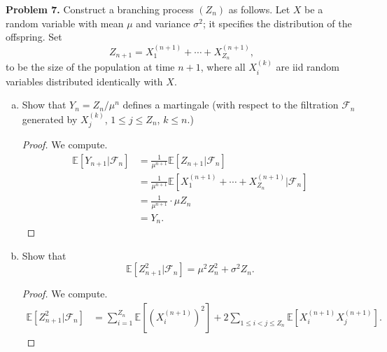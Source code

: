\documentclass[11pt,letterpaper]{report}
\newcommand{\mcal}[1]{\mathcal{#1}}
\newcommand{\E}{\mathbb{E}}
\begin{document}
\noindent\textbf{Problem 7. }
Construct a branching process $(Z_n)$ as follows. Let $X$ be a random variable with mean $\mu$ and variance $\sigma^2$; it specifies the distribution of the offspring. Set
\[
Z_{n+1} = X_1^{(n+1)} + \cdots + X_{Z_n}^{(n+1)},
\]
to be the size of the population at time $n+1$, where all $X_i^{(k)}$ are iid random variables distributed identically with $X$.
\begin{enumerate}[(a)]
	\item Show that $Y_n = Z_n/\mu^n$ defines a martingale (with respect to the filtration $\mcal{F}_n$ generated by $X_j^{(k)}$, $1\leq j\leq Z_n$, $k\leq n$.)
	\begin{proof}
		We compute.
		\begin{align*}
			\E[Y_{n+1}|\mcal{F}_n] &= \frac{1}{\mu^{n+1}}\E[Z_{n+1}|\mcal{F}_n]\\
			&= \frac{1}{\mu^{n+1}}\E[X_1^{(n+1)} + \cdots + X_{Z_n}^{(n+1)}|\mcal{F}_n]\\
			&= \frac{1}{\mu^{n+1}}\cdot \mu Z_n\\
			&= Y_n.
		\end{align*}
	\end{proof}

	\item Show that
	\[
	\E[Z_{n+1}^2|\mcal{F}_n] = \mu^2Z_n^2 + \sigma^2Z_n.
	\]
	\begin{proof}
		We compute.
		\begin{align*}
			\E[Z_{n+1}^2|\mcal{F}_n] &= \sum_{i=1}^{Z_n}\E[(X^{(n+1)}_i)^2] + 2\sum_{1\leq i<j\leq Z_n}\E[X_i^{(n+1)}X_j^{(n+1)}].
		\end{align*}
	\end{proof}
\end{enumerate}
\end{document}
